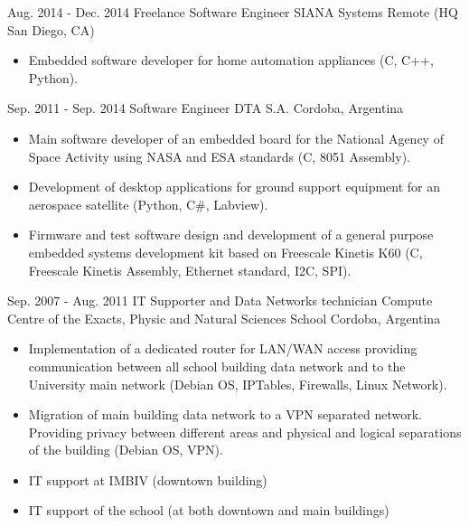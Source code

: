   \cventry
    {Aug. 2014 - Dec. 2014} %
    {Freelance Software Engineer} %
    {SIANA Systems} %
    {Remote (HQ San Diego, CA)} %
    {}
    {
      \begin{itemize} %
        \item {Embedded software developer for home automation appliances (C, C++, Python).}
      \end{itemize}
    }

  \cventry
    {Sep. 2011 - Sep. 2014} %
    {Software Engineer} %
    {DTA S.A.} %
    {Cordoba, Argentina} %
    {}
    {
      \begin{itemize} %
        \item {Main software developer of an embedded board for the National Agency of Space Activity using NASA and ESA standards (C, 8051 Assembly).}
        \item {Development of desktop applications for ground support equipment for an aerospace satellite (Python, C\#, Labview).}
        \item {Firmware and test software design and development of a general purpose embedded systems development kit based on Freescale Kinetis K60 (C, Freescale Kinetis Assembly, Ethernet standard, I2C, SPI).}
      \end{itemize}
    }

  \cventry
    {Sep. 2007 - Aug. 2011} %
    {IT Supporter and Data Networks technician} %
    {Compute Centre of the Exacts, Physic and Natural Sciences School} %
    {Cordoba, Argentina} %
    {}
    {
      \begin{itemize} %
        \item {Implementation of a dedicated router for LAN/WAN access providing communication between all school building data network and to the University main network (Debian OS, IPTables, Firewalls, Linux Network).}
        \item {Migration of main building data network to a VPN separated network. Providing privacy between different areas and physical and logical separations of the building (Debian OS, VPN)}.
        \item {IT support at IMBIV (downtown building)}
        \item {IT support of the school (at both downtown and main buildings)}
      \end{itemize}
    }

